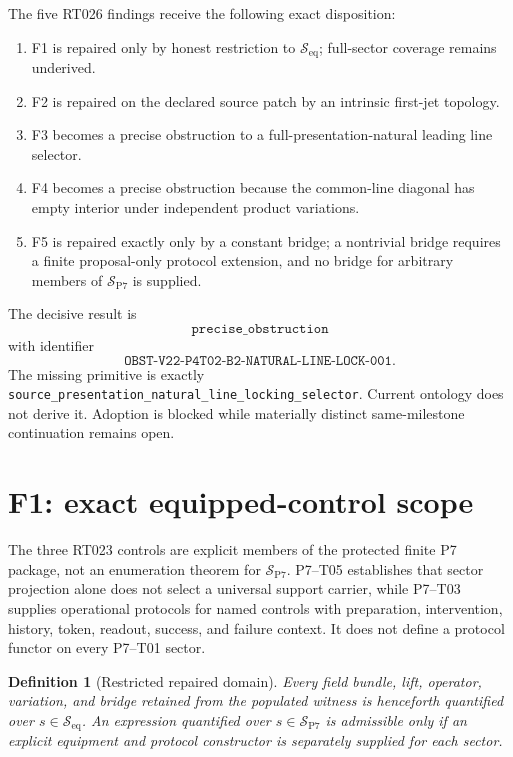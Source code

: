 \documentclass[11pt]{article}
\newtheorem{definition}{Definition}
\newcommand{\Seq}{\mathcal S_{\mathrm{eq}}}
\newcommand{\Sall}{\mathcal S_{\mathrm{P7}}}
\begin{document}
The five RT026 findings receive the following exact disposition:
\begin{enumerate}[leftmargin=*]
\item F1 is repaired only by honest restriction to \(\Seq\); full-sector
coverage remains underived.
\item F2 is repaired on the declared source patch by an intrinsic first-jet
topology.
\item F3 becomes a precise obstruction to a full-presentation-natural leading
line selector.
\item F4 becomes a precise obstruction because the common-line diagonal has
empty interior under independent product variations.
\item F5 is repaired exactly only by a constant bridge; a nontrivial bridge
requires a finite proposal-only protocol extension, and no bridge for arbitrary
members of \(\Sall\) is supplied.
\end{enumerate}

The decisive result is
\[
 \boxed{\texttt{precise\_obstruction}}
\]
with identifier
\[
 \texttt{OBST-V22-P4T02-B2-NATURAL-LINE-LOCK-001}.
\]
The missing primitive is exactly
\texttt{source\_presentation\_natural\_line\_locking\_selector}.  Current
ontology does not derive it.  Adoption is blocked while materially distinct
same-milestone continuation remains open.

\section{F1: exact equipped-control scope}

The three RT023 controls are explicit members of the protected finite P7
package, not an enumeration theorem for \(\Sall\).  P7--T05 establishes that
sector projection alone does not select a universal support carrier, while
P7--T03 supplies operational protocols for named controls with preparation,
intervention, history, token, readout, success, and failure context.  It does
not define a protocol functor on every P7--T01 sector.

\begin{definition}[Restricted repaired domain]
Every field bundle, lift, operator, variation, and bridge retained from the
populated witness is henceforth quantified over \(s\in\Seq\).  An expression
quantified over \(s\in\Sall\) is admissible only if an explicit equipment and
protocol constructor is separately supplied for each sector.
\end{definition}
\end{document}
